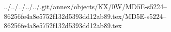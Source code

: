 ../../../../../.git/annex/objects/KX/0W/MD5E-s5224--86256fe4a8e5752f132d5393dd12ab89.tex/MD5E-s5224--86256fe4a8e5752f132d5393dd12ab89.tex